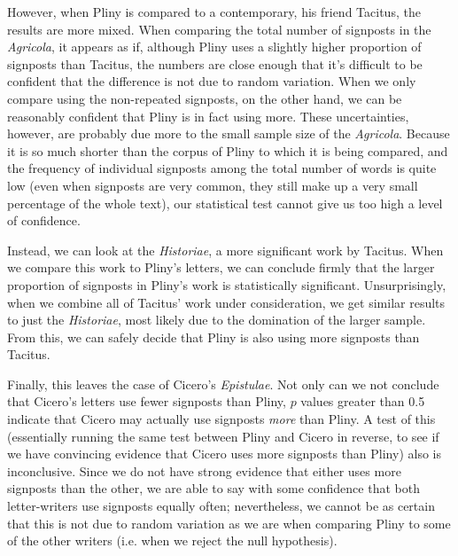 However, when Pliny is compared to a contemporary, his friend Tacitus, the results are more mixed. When comparing the total number of signposts in the \textit{Agricola}, it appears as if, although Pliny uses a slightly higher proportion of signposts than Tacitus, the numbers are close enough that it's difficult to be confident that the difference is not due to random variation. When we only compare using the non-repeated signposts, on the other hand, we can be reasonably confident that Pliny is in fact using more. These uncertainties, however, are probably due more to the small sample size of the \textit{Agricola}. Because it is so much shorter than the corpus of Pliny to which it is being compared, and the frequency of individual signposts among the total number of words is quite low (even when signposts are very common, they still make up a very small percentage of the whole text), our statistical test cannot give us too high a level of confidence. 

Instead, we can look at the \textit{Historiae}, a more significant work by Tacitus. When we compare this work to Pliny's letters, we can conclude firmly that the larger proportion of signposts in Pliny's work is statistically significant. Unsurprisingly, when we combine all of Tacitus' work under consideration, we get similar results to just the \textit{Historiae}, most likely due to the domination of the larger sample. From this, we can safely decide that Pliny is also using more signposts than Tacitus.

Finally, this leaves the case of Cicero's \textit{Epistulae}. Not only can we not conclude that Cicero's letters use fewer signposts than Pliny, $p$ values greater than 0.5 indicate that Cicero may actually use signposts \textit{more} than Pliny. A test of this (essentially running the same test between Pliny and Cicero in reverse, to see if we have convincing evidence that Cicero uses more signposts than Pliny) also is inconclusive. Since we do not have strong evidence that either uses more signposts than the other, we are able to say with some confidence that both letter-writers use signposts equally often; nevertheless, we cannot be as certain that this is not due to random variation as we are when comparing Pliny to some of the other writers (i.e. when we reject the null hypothesis). 

